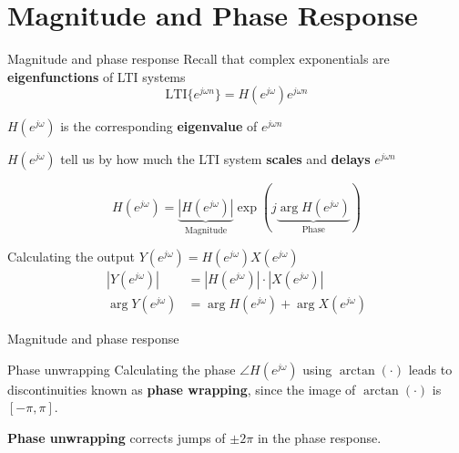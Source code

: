 \documentclass[10pt, aspectratio=169]{beamer}
\begin{document}
\section{Magnitude and Phase Response}
\begin{frame}{Magnitude and phase response}
Recall that complex exponentials are \textbf{eigenfunctions} of LTI systems
\begin{equation*}
\mathrm{LTI}\{e^{j\omega n}\} = H(e^{j\omega})e^{j\omega n}
\end{equation*}

$H(e^{j\omega})$ is the corresponding \textbf{eigenvalue} of $e^{j\omega n}$

$H(e^{j\omega})$ tell us by how much the LTI system \textbf{scales} and \textbf{delays} $e^{j\omega n}$

\begin{equation*}
H(e^{j\omega}) = \underbrace{|H(e^{j\omega})|}_{\text{Magnitude}}\exp(j\underbrace{\arg H(e^{j\omega})}_{\text{Phase}}) \tag{polar coordinates}
\end{equation*}

\pause
Calculating the output $Y(e^{j\omega}) = H(e^{j\omega})X(e^{j\omega})$
\begin{align*}
|Y(e^{j\omega})| &= |H(e^{j\omega})|\cdot|X(e^{j\omega})| \tag{magnitudes multiply} \\ 
\arg Y(e^{j\omega}) &= \arg H(e^{j\omega}) + \arg X(e^{j\omega}) \tag{phases add}
\end{align*} 
\end{frame}

%
\begin{frame}{Magnitude and phase response}	
	\begin{center}
	\end{center}
\end{frame}

%
\begin{frame}{Phase unwrapping}
	Calculating the phase $\angle H(e^{j\omega})$ using $\arctan(\cdot)$ leads to discontinuities known as \textbf{phase wrapping}, since the image of $\arctan(\cdot)$ is $[-\pi, \pi]$.
	
	\textbf{Phase unwrapping} corrects jumps of $\pm2\pi$ in the phase response.
	
	\begin{center}
		\resizebox{0.93\textwidth}{!}{}
	\end{center}	
	
\end{frame}
\end{document}
